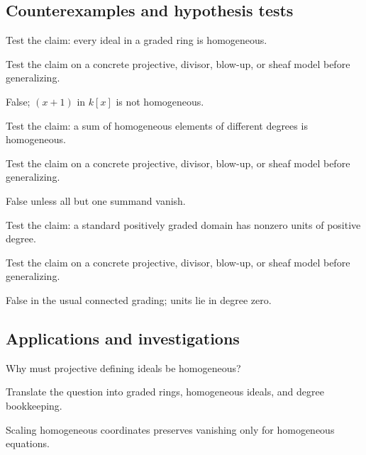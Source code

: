 \subsection*{Counterexamples and hypothesis tests}

\begin{exercise}\label{exr:vi34-expand-10}
Test the claim: every ideal in a graded ring is homogeneous.
\end{exercise}
\begin{hint}
Test the claim on a concrete projective, divisor, blow-up, or sheaf model before generalizing.
\end{hint}
\begin{solution}
False; $(x+1)$ in $k[x]$ is not homogeneous.
\end{solution}

\begin{exercise}\label{exr:vi34-expand-11}
Test the claim: a sum of homogeneous elements of different degrees is homogeneous.
\end{exercise}
\begin{hint}
Test the claim on a concrete projective, divisor, blow-up, or sheaf model before generalizing.
\end{hint}
\begin{solution}
False unless all but one summand vanish.
\end{solution}

\begin{exercise}\label{exr:vi34-expand-12}
Test the claim: a standard positively graded domain has nonzero units of positive degree.
\end{exercise}
\begin{hint}
Test the claim on a concrete projective, divisor, blow-up, or sheaf model before generalizing.
\end{hint}
\begin{solution}
False in the usual connected grading; units lie in degree zero.
\end{solution}

\subsection*{Applications and investigations}

\begin{exercise}\label{exr:vi34-expand-13}
Why must projective defining ideals be homogeneous?
\end{exercise}
\begin{hint}
Translate the question into graded rings, homogeneous ideals, and degree bookkeeping.
\end{hint}
\begin{solution}
Scaling homogeneous coordinates preserves vanishing only for homogeneous equations.
\end{solution}

